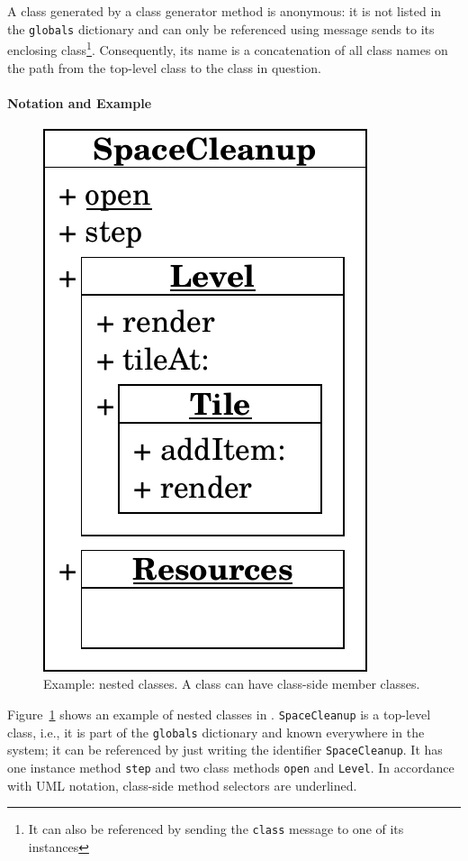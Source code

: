 A class generated by a class generator method is anonymous: it is not listed in the \texttt{globals} dictionary and can only be referenced using message sends to its enclosing class\footnote{It can also be referenced by sending the \texttt{class} message to one of its instances}. Consequently, its name is a concatenation of all class names on the path from the top-level class to the class in question.


\paragraph{Notation and Example}
\begin{figure}
	\includegraphics[scale=0.75]{nested_notation.pdf}
	\centering
	\caption[Example: Nested classes]{Example: nested classes. A class can have class-side member classes.}
	\label{fig:concept_nested_notation}
\end{figure}

Figure~\ref{fig:concept_nested_notation} shows an example of nested classes in \msname. \texttt{SpaceCleanup} is a top-level class, i.e., it is part of the \texttt{globals} dictionary and known everywhere in the system; it can be referenced by just writing the identifier \texttt{SpaceCleanup}. It has one instance method \texttt{step} and two class methods \texttt{open} and \texttt{Level}. In accordance with UML notation, class-side method selectors are underlined. 

